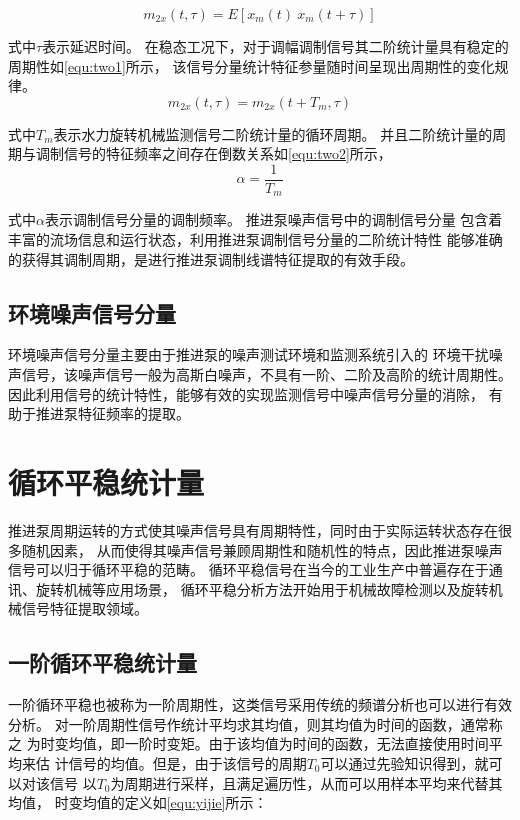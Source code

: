 \begin{equation}
    \label{equ:two}
    m_{2x}\left ( t, \tau \right )  =E\left [ x_{m}\left ( t \right ) \ x_{m}\left ( t+\tau \right )  \right ] 
\end{equation}

式中$\tau$表示延迟时间。
在稳态工况下，对于调幅调制信号其二阶统计量具有稳定的周期性如\autoref{equ:two1}所示，
该信号分量统计特征参量随时间呈现出周期性的变化规律。
\begin{equation}
    \label{equ:two1}
    m_{2x}\left ( t, \tau \right )  =m_{2x}\left ( t+T_m, \tau \right )
\end{equation}

式中$T_m$表示水力旋转机械监测信号二阶统计量的循环周期。
并且二阶统计量的周期与调制信号的特征频率之间存在倒数关系如\autoref{equ:two2}所示，
\begin{equation}
    \label{equ:two2}
    \alpha =\frac{1}{T_{m} } 
\end{equation}

式中$\alpha$表示调制信号分量的调制频率。
推进泵噪声信号中的调制信号分量
包含着丰富的流场信息和运行状态，利用推进泵调制信号分量的二阶统计特性
能够准确的获得其调制周期，是进行推进泵调制线谱特征提取的有效手段。
\subsection{环境噪声信号分量}
环境噪声信号分量主要由于推进泵的噪声测试环境和监测系统引入的
环境干扰噪声信号，该噪声信号一般为高斯白噪声，不具有一阶、二阶及高阶的统计周期性。
因此利用信号的统计特性，能够有效的实现监测信号中噪声信号分量的消除，
有助于推进泵特征频率的提取。

\section{循环平稳统计量}
推进泵周期运转的方式使其噪声信号具有周期特性，同时由于实际运转状态存在很多随机因素，
从而使得其噪声信号兼顾周期性和随机性的特点，因此推进泵噪声信号可以归于循环平稳的范畴。
循环平稳信号在当今的工业生产中普遍存在于通讯、旋转机械等应用场景，
循环平稳分析方法开始用于机械故障检测以及旋转机械信号特征提取领域。
\subsection{一阶循环平稳统计量}
一阶循环平稳也被称为一阶周期性，这类信号采用传统的频谱分析也可以进行有效分析。
对一阶周期性信号作统计平均求其均值，则其均值为时间的函数，通常称之
为时变均值，即一阶时变矩。由于该均值为时间的函数，无法直接使用时间平均来估
计信号的均值。但是，由于该信号的周期$T_{0}$可以通过先验知识得到，就可以对该信号
以$T_{0}$为周期进行采样，且满足遍历性，从而可以用样本平均来代替其均值，
时变均值的定义如\autoref{equ:yijie}所示：

